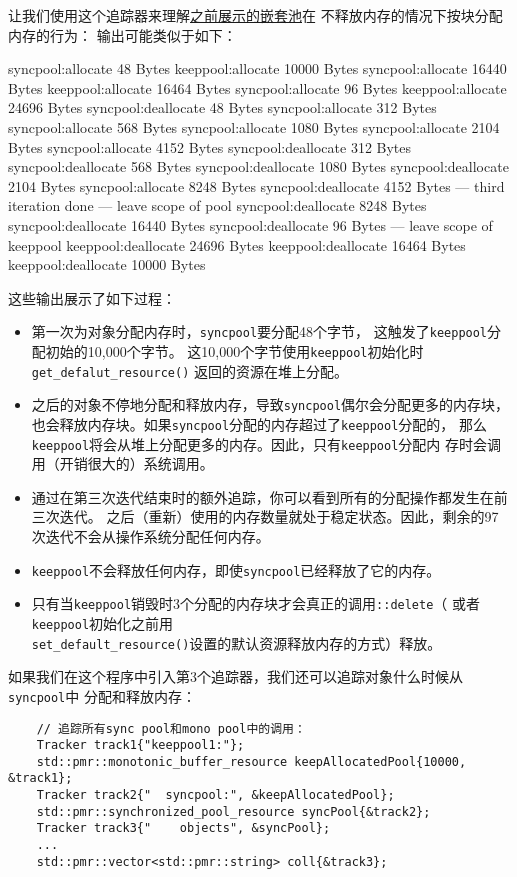 让我们使用这个追踪器来理解\hyperref[嵌套池]{之前展示的嵌套池}在
不释放内存的情况下按块分配内存的行为：\label{追踪嵌套池的allocation}
输出可能类似于如下：
\begin{blacklisting}
      syncpool:allocate 48 Bytes
    keeppool:allocate 10000 Bytes
      syncpool:allocate 16440 Bytes
    keeppool:allocate 16464 Bytes
      syncpool:allocate 96 Bytes
    keeppool:allocate 24696 Bytes
      syncpool:deallocate 48 Bytes
      syncpool:allocate 312 Bytes
      syncpool:allocate 568 Bytes
      syncpool:allocate 1080 Bytes
      syncpool:allocate 2104 Bytes
      syncpool:allocate 4152 Bytes
      syncpool:deallocate 312 Bytes
      syncpool:deallocate 568 Bytes
      syncpool:deallocate 1080 Bytes
      syncpool:deallocate 2104 Bytes
      syncpool:allocate 8248 Bytes
      syncpool:deallocate 4152 Bytes
    --- third iteration done
    --- leave scope of pool
      syncpool:deallocate 8248 Bytes
      syncpool:deallocate 16440 Bytes
      syncpool:deallocate 96 Bytes
    --- leave scope of keeppool
    keeppool:deallocate 24696 Bytes
    keeppool:deallocate 16464 Bytes
    keeppool:deallocate 10000 Bytes
\end{blacklisting}
这些输出展示了如下过程：
\begin{itemize}
    \item 第一次为对象分配内存时，\texttt{syncpool}要分配48个字节，
    这触发了\texttt{keeppool}分配初始的10,000个字节。
    这10,000个字节使用\texttt{keeppool}初始化时\texttt{get\_defalut\_resource()}
    返回的资源在堆上分配。
    \item 之后的对象不停地分配和释放内存，导致\texttt{syncpool}偶尔会分配更多的内存块，
    也会释放内存块。如果\texttt{syncpool}分配的内存超过了\texttt{keeppool}分配的，
    那么\texttt{keeppool}将会从堆上分配更多的内存。因此，只有\texttt{keeppool}分配内
    存时会调用（开销很大的）系统调用。
    \item 通过在第三次迭代结束时的额外追踪，你可以看到所有的分配操作都发生在前三次迭代。
    之后（重新）使用的内存数量就处于稳定状态。因此，剩余的97次迭代不会从操作系统分配任何内存。
    \item \texttt{keeppool}不会释放任何内存，即使\texttt{syncpool}已经释放了它的内存。
    \item 只有当\texttt{keeppool}销毁时3个分配的内存块才会真正的调用\texttt{::delete}（
    或者\texttt{keeppool}初始化之前用\\
    \texttt{set\_default\_resource()}设置的默认资源释放内存的方式）释放。
\end{itemize}
如果我们在这个程序中引入第3个追踪器，我们还可以追踪对象什么时候从\texttt{syncpool}中
分配和释放内存：
\begin{lstlisting}
    // 追踪所有sync pool和mono pool中的调用：
    Tracker track1{"keeppool1:"};
    std::pmr::monotonic_buffer_resource keepAllocatedPool{10000, &track1};
    Tracker track2{"  syncpool:", &keepAllocatedPool};
    std::pmr::synchronized_pool_resource syncPool{&track2};
    Tracker track3{"    objects", &syncPool};
    ...
    std::pmr::vector<std::pmr::string> coll{&track3};
\end{lstlisting}

